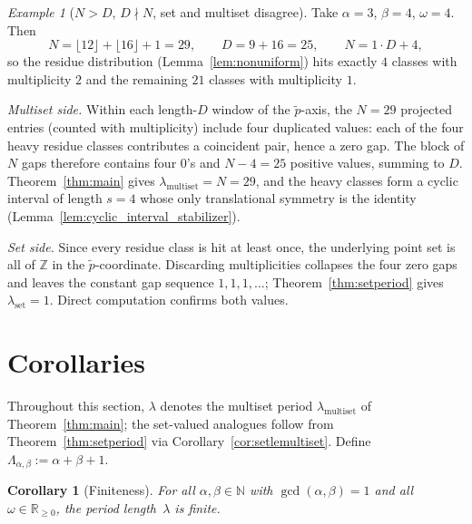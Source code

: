 \documentclass[11pt,reqno]{amsart}
\theoremstyle{plain}
\newtheorem{corollary}[theorem]{Corollary}
\theoremstyle{definition}
\theoremstyle{remark}
\newtheorem{example}[theorem]{Example}
\begin{document}
\begin{example}[\(N > D\), \(D \nmid N\), set and multiset disagree]
\label{ex:set_gt}
Take \(\alpha = 3\), \(\beta = 4\), \(\omega = 4\).  Then
\[
    N = \lfloor 12 \rfloor + \lfloor 16 \rfloor + 1 = 29,
    \qquad
    D = 9 + 16 = 25,
    \qquad
    N = 1 \cdot D + 4,
\]
so the residue distribution
(Lemma~\ref{lem:nonuniform}) hits exactly \(4\) classes with
multiplicity \(2\) and the remaining \(21\) classes with
multiplicity \(1\).

\medskip
\noindent\emph{Multiset side.}  Within each length-\(D\) window of the
\(\tilde{p}\)-axis, the \(N = 29\) projected entries (counted with
multiplicity) include four duplicated values: each of the four
heavy residue classes contributes a coincident pair, hence a zero
gap.  The block of \(N\) gaps therefore contains four \(0\)'s and
\(N - 4 = 25\) positive values, summing to \(D\).
Theorem~\ref{thm:main} gives
\(\lambda_{\mathrm{multiset}} = N = 29\), and the heavy classes form
a cyclic interval of length \(s = 4\) whose only translational
symmetry is the identity
(Lemma~\ref{lem:cyclic_interval_stabilizer}).

\medskip
\noindent\emph{Set side.}  Since every residue class is hit at least
once, the underlying point set is all of \(\mathbb{Z}\) in the
\(\tilde{p}\)-coordinate.  Discarding multiplicities collapses the four
zero gaps and leaves the constant gap sequence \(1, 1, 1, \ldots\);
Theorem~\ref{thm:setperiod} gives
\(\lambda_{\mathrm{set}} = 1\).  Direct computation confirms both
values.
\end{example}

\section{Corollaries}\label{sec:corollaries}

Throughout this section, \(\lambda\) denotes the multiset period
\(\lambda_{\mathrm{multiset}}\) of Theorem~\ref{thm:main}; the
set-valued analogues follow from Theorem~\ref{thm:setperiod} via
Corollary~\ref{cor:setlemultiset}.  Define
\(\Lambda_{\alpha,\beta} := \alpha + \beta + 1\).

\begin{corollary}[Finiteness]\label{cor:finite}
For all \(\alpha, \beta \in \mathbb{N}\) with \(\gcd(\alpha,\beta)=1\) and
all \(\omega \in \mathbb{R}_{\ge 0}\), the period length~\(\lambda\) is
finite.
\end{corollary}
\end{document}
